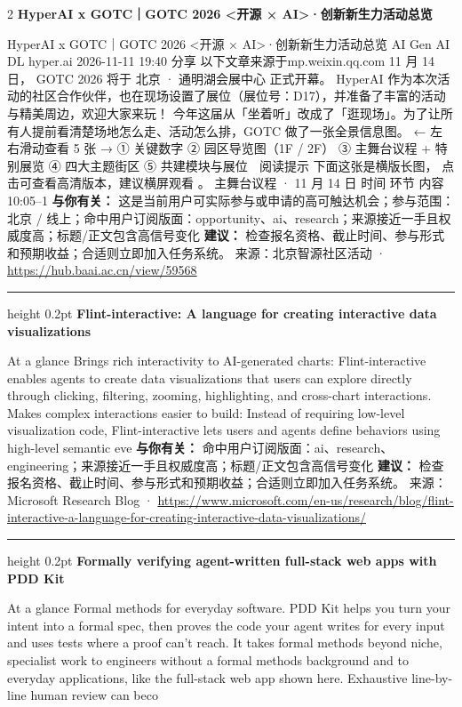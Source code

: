 \documentclass[10.5pt]{ctexart}
\begin{document}
\begin{multicols}{2}
{\large\bfseries HyperAI x GOTC｜GOTC 2026 <开源 × AI>·创新新生力活动总览}\par
HyperAI x GOTC｜GOTC 2026 <开源 × AI>·创新新生力活动总览 AI Gen AI DL hyper.ai 2026-11-11 19:40 分享 以下文章来源于mp.weixin.qq.com 11 月 14 日， GOTC 2026 将于 北京 · 通明湖会展中心 正式开幕。 HyperAI 作为本次活动的社区合作伙伴，也在现场设置了展位（展位号：D17），并准备了丰富的活动与精美周边，欢迎大家来玩！ 今年这届从「坐着听」改成了「逛现场」。为了让所有人提前看清楚场地怎么走、活动怎么排，GOTC 做了一张全景信息图。 ← 左右滑动查看 5 张 → ① 关键数字 ② 园区导览图（1F / 2F） ③ 主舞台议程 + 特别展览 ④ 四大主题街区 ⑤ 共建模块与展位 📱 阅读提示 下面这张是横版长图， 点击可查看高清版本，建议横屏观看 。 主舞台议程 · 11 月 14 日 时间 环节 内容 10:05–1
\textbf{与你有关：} 这是当前用户可实际参与或申请的高可触达机会；参与范围：北京 / 线上；命中用户订阅版面：opportunity、ai、research；来源接近一手且权威度高；标题/正文包含高信号变化
\textbf{建议：} 检查报名资格、截止时间、参与形式和预期收益；合适则立即加入任务系统。
{\footnotesize\color{ormuted} 来源：北京智源社区活动 · \url{https://hub.baai.ac.cn/view/59568}}
\vspace{2mm}
\hrule height 0.2pt
\vspace{2mm}
{\large\bfseries Flint-interactive: A language for creating interactive data visualizations}\par
At a glance Brings rich interactivity to AI-generated charts: Flint-interactive enables agents to create data visualizations that users can explore directly through clicking, filtering, zooming, highlighting, and cross-chart interactions. Makes complex interactions easier to build: Instead of requiring low-level visualization code, Flint-interactive lets users and agents define behaviors using high-level semantic eve
\textbf{与你有关：} 命中用户订阅版面：ai、research、engineering；来源接近一手且权威度高；标题/正文包含高信号变化
\textbf{建议：} 检查报名资格、截止时间、参与形式和预期收益；合适则立即加入任务系统。
{\footnotesize\color{ormuted} 来源：Microsoft Research Blog · \url{https://www.microsoft.com/en-us/research/blog/flint-interactive-a-language-for-creating-interactive-data-visualizations/}}
\vspace{2mm}
\hrule height 0.2pt
\vspace{2mm}
{\large\bfseries Formally verifying agent-written full-stack web apps with PDD Kit}\par
At a glance Formal methods for everyday software. PDD Kit helps you turn your intent into a formal spec, then proves the code your agent writes for every input and uses tests where a proof can’t reach. It takes formal methods beyond niche, specialist work to engineers without a formal methods background and to everyday applications, like the full-stack web app shown here. Exhaustive line-by-line human review can beco

\end{multicols}
\end{document}

